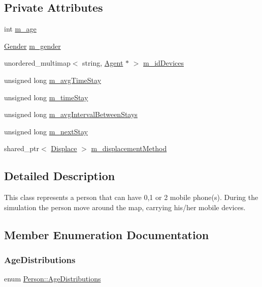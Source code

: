 \subsection*{Private Attributes}
\begin{DoxyCompactItemize}
\item 
int \mbox{\hyperlink{class_person_a743e071da10a5ac9150f61df919cfbb4}{m\+\_\+age}}
\item 
\mbox{\hyperlink{class_person_aff84ca16bd4dbf364614d86f20b29dd2}{Gender}} \mbox{\hyperlink{class_person_ade9cdf49acde95c75f19f0b0d24c8c9a}{m\+\_\+gender}}
\item 
unordered\+\_\+multimap$<$ string, \mbox{\hyperlink{class_agent}{Agent}} $\ast$ $>$ \mbox{\hyperlink{class_person_a95b2e60a54b72aea51a7600048e76291}{m\+\_\+id\+Devices}}
\item 
unsigned long \mbox{\hyperlink{class_person_a8c9502459dd59182d11f60f429b44457}{m\+\_\+avg\+Time\+Stay}}
\item 
unsigned long \mbox{\hyperlink{class_person_a5554109f1f3a7c466f02346d0061c6e7}{m\+\_\+time\+Stay}}
\item 
unsigned long \mbox{\hyperlink{class_person_a62a07c9565931a618a09be7510dde07c}{m\+\_\+avg\+Interval\+Between\+Stays}}
\item 
unsigned long \mbox{\hyperlink{class_person_ad8809184fc32b28b1bcc115b10493b55}{m\+\_\+next\+Stay}}
\item 
shared\+\_\+ptr$<$ \mbox{\hyperlink{class_displace}{Displace}} $>$ \mbox{\hyperlink{class_person_a92ceead10a7ca858d2151391e4421843}{m\+\_\+displacement\+Method}}
\end{DoxyCompactItemize}


\subsection{Detailed Description}
This class represents a person that can have 0,1 or 2 mobile phone(s). During the simulation the person move around the map, carrying his/her mobile devices. 

\subsection{Member Enumeration Documentation}
\mbox{\label{class_person_a53376a9a5852ec7760488a01c37f0b0b}} 
\subsubsection{\texorpdfstring{AgeDistributions}{AgeDistributions}}
{\footnotesize\ttfamily enum \mbox{\hyperlink{class_person_a53376a9a5852ec7760488a01c37f0b0b}{Person\+::\+Age\+Distributions}}}

